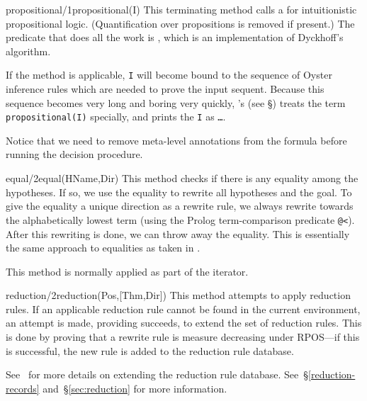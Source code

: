 \begin{method}{propositional/1}{propositional(I)}%
{\tiny
}
This terminating method calls a  for
intuitionistic propositional logic.  (Quantification over propositions
is removed if present.)  The predicate that does all the work is
, which is an implementation of Dyckhoff's
algorithm.

If the method is applicable, {\tt I} will become bound to the sequence
of Oyster inference rules which are needed to prove the input
sequent. Because this sequence becomes very long and boring very
quickly, {\clam}'s  (see
\S{}) treats the term {\tt propositional(I)}
specially, and prints the {\tt I} as {\tt \ldots}.

Notice that we need to remove meta-level annotations from the formula
before running the decision procedure.
\end{method}

\begin{method}{equal/2}{equal(HName,Dir)}%
{\tiny
}
This method checks if there is any equality among the hypotheses.
If so, we use the equality to rewrite all hypotheses and the goal. To
give the equality a unique direction as a rewrite rule, we always
rewrite towards the alphabetically lowest term (using the Prolog
term-comparison predicate \verb'@<'). After this rewriting is done, we
can throw away the equality. This is essentially the same approach to
equalities as taken in \cite{boyerbook}.

This method is normally applied as part of the 
iterator. 
\end{method}

\begin{method}{reduction/2}{reduction(Pos,[Thm,Dir])}%
{\tiny
}
This method attempts to apply reduction rules.  If an applicable
reduction rule cannot be found in the current environment, an attempt
is made, providing  succeeds, to extend the
set of reduction rules.  This is done by proving that a rewrite rule
is measure decreasing under RPOS---if this is successful, the new rule
is added to the reduction rule database.

See~ for more details on extending the
reduction rule database.  See~\S\ref{reduction-records}
and~\S\ref{sec:reduction} for more information.
\end{method}

